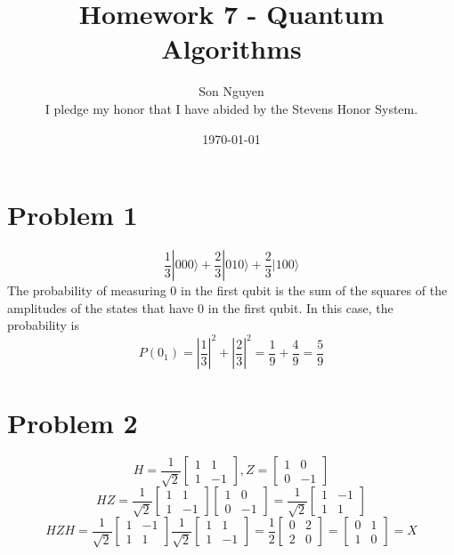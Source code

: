 \documentclass[12pt]{article}
\title{Homework 7 - Quantum Algorithms}
\author{Son Nguyen \\
I pledge my honor that I have abided by the Stevens Honor System.}
\date{\today}
\begin{document}
\maketitle
\section*{Problem 1}
\[\frac{1}{3}|000\rangle + \frac{2}{3}|010\rangle + \frac{2}{3}|100\rangle\]
The probability of measuring 0 in the first qubit is the sum of the squares of the amplitudes of the states that have 0 in the first qubit. In this case, the probability is
\[
	P(0_{1}) = \left|\frac{1}{3}\right|^2 + \left|\frac{2}{3}\right|^2 = \frac{1}{9} + \frac{4}{9} = \frac{5}{9}
\]

\section*{Problem 2}
\[
	H = \frac{1}{\sqrt{2}} \begin{bmatrix}
		1 & 1  \\
		1 & -1
	\end{bmatrix},
	Z = \begin{bmatrix}
		1 & 0  \\
		0 & -1
	\end{bmatrix}
\]
\[HZ = \frac{1}{\sqrt{2}} \begin{bmatrix}
		1 & 1  \\
		1 & -1
	\end{bmatrix} \begin{bmatrix}
		1 & 0  \\
		0 & -1
	\end{bmatrix} = \frac{1}{\sqrt{2}} \begin{bmatrix}
		1 & -1 \\
		1 & 1
	\end{bmatrix}
\]
\[HZH = \frac{1}{\sqrt{2}} \begin{bmatrix}
		1 & -1 \\
		1 & 1
	\end{bmatrix}
	\frac{1}{\sqrt{2}}\begin{bmatrix}
		1 & 1  \\
		1 & -1
	\end{bmatrix} =
	\frac{1}{2} \begin{bmatrix}
		0 & 2 \\
		2 & 0
	\end{bmatrix} = \begin{bmatrix}
		0 & 1 \\
		1 & 0
	\end{bmatrix} = X
\]
\end{document}
